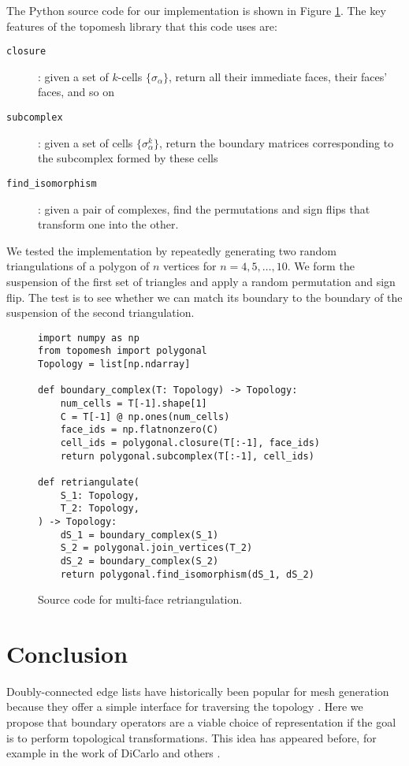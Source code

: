 \documentclass[twocolumn]{article}
\begin{document}
The Python source code for our implementation is shown in Figure \ref{fig:mfrt-code}.
The key features of the topomesh library that this code uses are:
\begin{description}
    \item[\texttt{closure}]: given a set of $k$-cells $\{\sigma_\alpha\}$, return all their immediate faces, their faces' faces, and so on
    \item[\texttt{subcomplex}]: given a set of cells $\{\sigma_\alpha^k\}$, return the boundary matrices corresponding to the subcomplex formed by these cells
    \item[\texttt{find\_isomorphism}]: given a pair of complexes, find the permutations and sign flips that transform one into the other.
\end{description}
We tested the implementation by repeatedly generating two random triangulations of a polygon of $n$ vertices for $n = 4, 5, \ldots, 10$.
We form the suspension of the first set of triangles and apply a random permutation and sign flip.
The test is to see whether we can match its boundary to the boundary of the suspension of the second triangulation.

\begin{figure}[t]
\begin{verbatim}
import numpy as np
from topomesh import polygonal
Topology = list[np.ndarray]

def boundary_complex(T: Topology) -> Topology:
    num_cells = T[-1].shape[1]
    C = T[-1] @ np.ones(num_cells)
    face_ids = np.flatnonzero(C)
    cell_ids = polygonal.closure(T[:-1], face_ids)
    return polygonal.subcomplex(T[:-1], cell_ids)

def retriangulate(
    S_1: Topology,
    T_2: Topology,
) -> Topology:
    dS_1 = boundary_complex(S_1)
    S_2 = polygonal.join_vertices(T_2)
    dS_2 = boundary_complex(S_2)
    return polygonal.find_isomorphism(dS_1, dS_2)
\end{verbatim}
    \caption{Source code for multi-face retriangulation.}
\label{fig:mfrt-code}
\end{figure}


\section{Conclusion}

Doubly-connected edge lists have historically been popular for mesh generation because they offer a simple interface for traversing the topology \cite{guibas1985primitives}.
Here we propose that boundary operators are a viable choice of representation if the goal is to perform topological transformations.
This idea has appeared before, for example in the work of DiCarlo and others \cite{dicarlo2007solid}.
\end{document}
